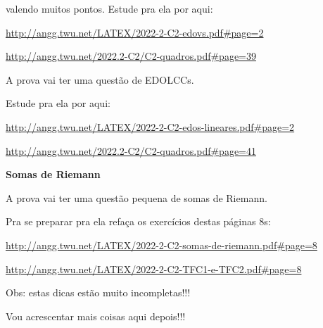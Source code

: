 \documentclass[oneside,12pt]{article}
\begin{document}
valendo muitos pontos. Estude pra ela por aqui:

\ssk

{\footnotesize

\url{http://angg.twu.net/LATEX/2022-2-C2-edovs.pdf\#page=2}

\url{http://angg.twu.net/2022.2-C2/C2-quadros.pdf\#page=39}

}

\bsk

A prova vai ter uma questão de EDOLCCs.

Estude pra ela por aqui:

\ssk

{\footnotesize

\url{http://angg.twu.net/LATEX/2022-2-C2-edos-lineares.pdf\#page=2}

\url{http://angg.twu.net/2022.2-C2/C2-quadros.pdf\#page=41}

}


\newpage


{\bf Somas de Riemann}

A prova vai ter uma questão pequena de somas de Riemann.

Pra se preparar pra ela refaça os exercícios destas páginas 8s:

\ssk

{\footnotesize

\url{http://angg.twu.net/LATEX/2022-2-C2-somas-de-riemann.pdf#page=8}

\url{http://angg.twu.net/LATEX/2022-2-C2-TFC1-e-TFC2.pdf#page=8}

}


\bsk
\bsk

{\sl

Obs: estas dicas estão muito incompletas!!!

Vou acrescentar mais coisas aqui depois!!!

}




\end{document}
